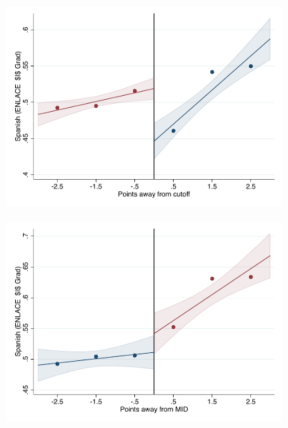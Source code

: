 \documentclass[oneside,11pt]{article}
\begin{document}
\begin{figure}[H]

    \ContinuedFloat
    \caption{(Cont.) RD plots for outcome variables across those assigned to either UNAM or IPN high-school, and those who are not\label{fig:ITT_rd_plot_elite_2}}
    \begin{center}
    
    \begin{subfigure}{0.475\textwidth}
        \centering
        \includegraphics[width=\textwidth]{04_Figures/rd_plot_tau_p_esp_3_pdelta3.pdf}
    \end{subfigure}
    \begin{subfigure}{0.475\textwidth}
        \centering
        \includegraphics[width=\textwidth]{04_Figures/rd_plot_mid_p_esp_3_pdelta3.pdf}
    \end{subfigure}


\end{center}
\end{figure}
\end{document}
